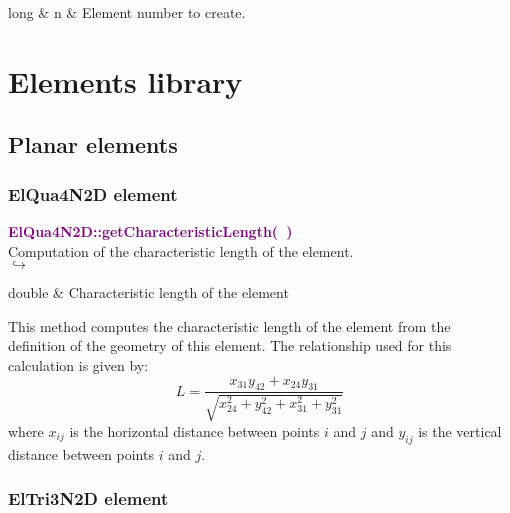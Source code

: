 \begin{tcolorbox}[width=\textwidth,myArgs,tabularx={ll|R}]
long & n & Element number to create.
\end{tcolorbox}


\section{Elements library}

\subsection{Planar elements}

\subsubsection{ElQua4N2D element}

\textcolor{purple}{\textbf{ElQua4N2D::getCharacteristicLength(~)}}\label{ElQua4N2D::getCharacteristicLength()}\\
Computation of the characteristic length of the element.\\ \hspace*{5mm}$\hookrightarrow$
\vspace*{-2em}\begin{tcolorbox}[grow to left by=-1cm, width=\textwidth-1cm,myArgs,tabularx={l|R}]
double & Characteristic length of the element
\end{tcolorbox}

This method computes the characteristic length of the element from the definition of the geometry of this element.
The relationship used for this calculation is given by:
\begin{equation}
L=\frac{x_{31} y_{42}+x_{24} y_{31}}{\sqrt{x_{24}^2+y_{42}^2+x_{31}^2+y_{31}^2}}
\end{equation}
where $x_{ij}$ is the horizontal distance between points $i$ and $j$ and $y_{ij}$ is the vertical distance between points $i$ and $j$.

\subsubsection{ElTri3N2D element}

